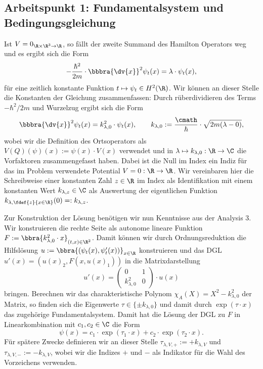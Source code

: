 \documentclass{subfiles}
\begin{document}
    \subsection{Arbeitspunkt 1: Fundamentalsystem und Bedingungsgleichung}
        Ist $V = 0_{\R\times\R^3\to\R}$, so fällt der zweite Summand des Hamilton Operators weg und es ergibt sich die Form
        \[
            -\frac{\hbar^2}{2m}\cdot\bbbra{\dv{x}}^2\psi_t(x) = \lambda\cdot\psi_t(x),
        \]
        für eine zeitlich konstante Funktion $t\mapsto \psi_t\in H^2(\R)$. 
        Wir können an dieser Stelle die Konstanten der Gleichung zusammenfassen: Durch rüberdividieren des Terms $-\hbar^2/2m$ und Wurzelzug ergibt sich die Form
        \[
            \bbbra{\dv{x}}^2\psi_t(x) = k_{\lambda,0}^2\cdot \psi_t(x),\qquad k_{\lambda,0}:=\frac{\cmath}{\hbar}\cdot\sqrt{2m(\lambda - 0)},
        \]
        wobei wir die Definition des Ortsoperators als $V(Q)(\psi)(x) := \psi(x)\cdot V(x)$ verwendet und in $\lambda\mapsto k_{\lambda,0}:\R\to\C$ die Vorfaktoren zusammengefasst haben. Dabei ist die Null im Index ein Indiz für das im Problem verwendete Potential $V = 0:\R\to\R$. Wir vereinbaren hier die Schreibweise einer konstanten Zahl $z\in\R$ im Index als Identifikation mit einem konstanten Wert $k_{\lambda,z}\in\C$ als Auswertung der eigentlichen Funktion $k_{\lambda,\fdef{z}{x\in\R}}(0) =: k_{\lambda,z}$. 

        Zur Konstruktion der Lösung benötigen wir nun Kenntnisse aus der Analysis 3. Wir konstruieren die rechte Seite als autonome lineare Funktion $F:=\bbra{k_{\lambda,0}^2\cdot x}_{(t,x)\in\R^2}$. Damit können wir durch Ordnungsreduktion die Hilfslösung $u:=\bbra{(\psi_t(x),\psi_t'(x))}_{x\in\R}$ konstruieren und das DGL $u'(x) = (u(x)_2,F(x,u(x)_1))$ in die Matrixdarstellung 
        \[
            u'(x) = \begin{pmatrix}
                0 & 1 \\
                k_{\lambda,0}^2 & 0
            \end{pmatrix}\cdot u(x)
        \]
        bringen. Berechnen wir das charakteristische Polynom $\chi_A(X) = X^2 - k_{\lambda,0}^2$ der Matrix, so finden sich die Eigenwerte $\tau\in\{\pm k_{\lambda,0}\}$ und damit durch $\exp(\tau\cdot x)$ das zugehörige Fundamentalsystem. Damit hat die Lösung der DGL zu $F$ in Linearkombination mit $c_1,c_2\in\C$ die Form
        \[
            \psi(x) = c_1\cdot \exp(\tau_1\cdot x) + c_2\cdot\exp(\tau_2\cdot x).
        \]
        Für spätere Zwecke definieren wir an dieser Stelle $\tau_{\lambda,V,+}:=+k_{\lambda,V}$ und $\tau_{\lambda,V,-}:=-k_{\lambda,V}$, wobei wir die Indizes $+$ und $-$ als Indikator für die Wahl des Vorzeichens verwenden. 
\end{document}
